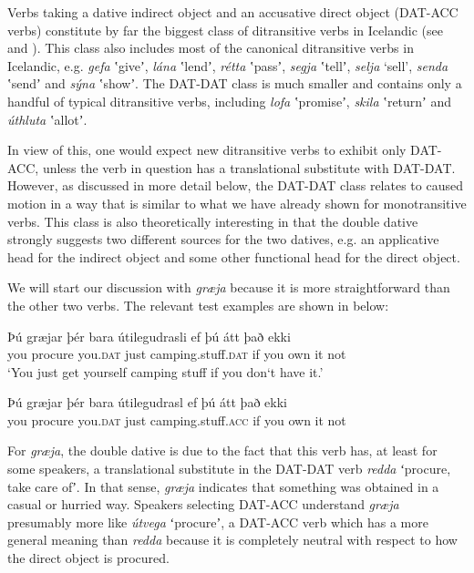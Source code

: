 \documentclass[output=paper,modfonts,nonflat]{langsci/langscibook}
\begin{document}
Verbs taking a dative indirect object and an accusative direct object (DAT-ACC verbs) constitute by far the biggest class of ditransitive verbs in Icelandic (see \citealt{ZaenenMalingThráinsson1985} and \citealt{Jónsson2000}). This class also includes most of the canonical ditransitive verbs in Icelandic, e.g. \textit{gefa} ʽgiveʼ, \textit{lána} ʽlendʼ, \textit{rétta} ʽpassʼ, \textit{segja} ʽtellʼ, \textit{selja} ‘sell’, \textit{senda} ʽsendʼ and \textit{sýna} ʽshowʼ. The DAT-DAT class is much smaller and contains only a handful of typical ditransitive verbs, including \textit{lofa} ʽpromiseʼ, \textit{skila} ʽreturnʼ and \textit{úthluta} ʽallotʼ. 

In view of this, one would expect new ditransitive verbs to exhibit only DAT-ACC, unless the verb in question has a translational substitute with DAT-DAT. However, as discussed in more detail below, the DAT-DAT class relates to caused motion in a way that is similar to what we have already shown for monotransitive verbs. This class is also theoretically interesting in that the double dative strongly suggests two different sources for the two datives, e.g. an applicative head for the indirect object and some other functional head for the direct object. 

We will start our discussion with \textit{græja} because it is more straightforward than the other two verbs. The relevant test examples are shown in  below:

 
\ea%
    \label{ex:jonsson:9}  
\ea
\gll  Þú  græjar  þér  bara  útilegudrasli  ef  þú  átt  það  ekki\\
   you  procure  you.\textsc{dat}  just  camping.stuff.\textsc{dat}  if  you  own  it  not\\
\glt `You just get yourself camping stuff if you don‘t have it.'
 
 
\ex
\gll   Þú  græjar  þér  bara  útilegudrasl  ef  þú  átt  það  ekki\\
 you  procure  you.\textsc{dat}  just  camping.stuff.\textsc{acc}  if  you  own  it  not\\
\z
\z

For \textit{græja}, the double dative is due to the fact that this verb has, at least for some speakers, a translational substitute in the DAT-DAT verb \textit{redda} ʻprocure, take care ofʼ. In that sense, \textit{græja} indicates that something was obtained in a casual or hurried way. Speakers selecting DAT-ACC understand \textit{græja} presumably more like \textit{útvega} ʻprocureʼ, a DAT-ACC verb which has a more general meaning than \textit{redda} because it is completely neutral with respect to how the direct object is procured.
\end{document}
